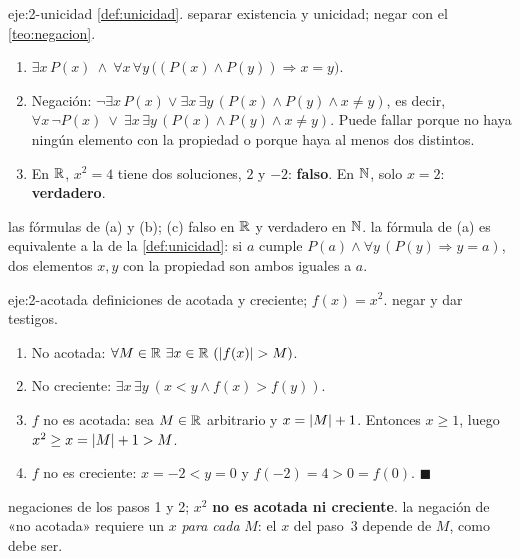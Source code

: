 \begin{solucion}{eje:2-unicidad}
\datos \cref{def:unicidad}.
\planteamiento separar existencia y unicidad; negar con el \cref{teo:negacion}.
\pasos
\begin{enumerate}[label=(\alph*)]
  \item $\exists x\,P(x)\ \wedge\ \forall x\,\forall y\,\bigl((P(x)\wedge P(y))\Rightarrow x=y\bigr)$.
  \item Negación: $\neg\exists x\,P(x)\vee\exists x\,\exists y\,(P(x)\wedge P(y)\wedge x\neq y)$, es decir, $\forall x\,\neg P(x)\ \vee\ \exists x\,\exists y\,(P(x)\wedge P(y)\wedge x\neq y)$. Puede fallar porque no haya ningún elemento con la propiedad o porque haya al menos dos distintos.
  \item En $\mathbb{R}$, $x^{2}=4$ tiene dos soluciones, $2$ y $-2$: \textbf{falso}. En $\mathbb{N}$, solo $x=2$: \textbf{verdadero}.
\end{enumerate}
\resultado las fórmulas de (a) y (b); (c) falso en $\mathbb{R}$ y verdadero en $\mathbb{N}$.
\comprobacion la fórmula de (a) es equivalente a la de la \cref{def:unicidad}: si $a$ cumple $P(a)\wedge\forall y\,(P(y)\Rightarrow y=a)$, dos elementos $x,y$ con la propiedad son ambos iguales a $a$.
\end{solucion}

\begin{solucion}{eje:2-acotada}
\datos definiciones de acotada y creciente; $f(x)=x^{2}$.
\planteamiento negar y dar testigos.
\pasos
\begin{enumerate}[label=\arabic*.]
  \item No acotada: $\forall M\in\mathbb{R}\ \exists x\in\mathbb{R}\ (\lvert f(x)\rvert>M)$.
  \item No creciente: $\exists x\,\exists y\ (x<y\wedge f(x)>f(y))$.
  \item $f$ no es acotada: sea $M\in\mathbb{R}$ arbitrario y $x=\lvert M\rvert+1$. Entonces $x\ge 1$, luego $x^{2}\ge x=\lvert M\rvert+1>M$.
  \item $f$ no es creciente: $x=-2<y=0$ y $f(-2)=4>0=f(0)$. $\blacksquare$
\end{enumerate}
\resultado negaciones de los pasos 1 y 2; $x^{2}$ \textbf{no es acotada ni creciente}.
\comprobacion la negación de «no acotada» requiere un $x$ \emph{para cada} $M$: el $x$ del paso~3 depende de $M$, como debe ser.
\end{solucion}

